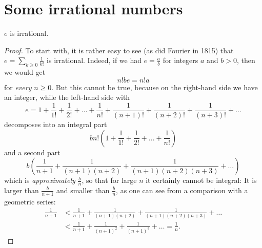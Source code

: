 \chapter{Some irrational numbers}


\begin{theorem}
  \label{e_irrational}
  \leanok
  $e$ is irrational.
\end{theorem}	
\begin{proof}
  To start with, it is rather easy to see (as did Fourier in 1815) that $e = \sum_{k \ge 0} \frac{1}{k!}$ is irrational.
  Indeed, if we had $e = \frac{a}{b}$ for integers $a$ and $b > 0$, then we would get
  \[
  n! b e = n! a
  \]
  for \emph{every} $n \ge 0$.
  But this cannot be true, because on the right-hand side we have an integer, while the left-hand side with
  \[
  e = 1 + \frac{1}{1!} + \frac{1}{2!} + \dots + \frac{1}{n!} + \frac{1}{(n+1)!} + \frac{1}{(n+2)!} + \frac{1}{(n+3)!} + \dots
  \]
  decomposes into an integral part
  \[
  b n! \left( 1 + \frac{1}{1!} + \frac{1}{2!} + \dots + \frac{1}{n!} \right)
  \]
  and a second part
  \[
  b \left( \frac{1}{n+1} + \frac{1}{(n+1)(n+2)} + \frac{1}{(n+1)(n+2)(n+3)} + \dots \right)
  \]
  which is \emph{approximately} $\frac{b}{n}$, so that for large $n$ it certainly cannot be integral:
  It is larger than $\frac{b}{n+1}$ and smaller than $\frac{b}{n}$, as one can see from a comparison with a geometric series:
  \begin{align*}
  \frac{1}{n+1} &< \frac{1}{n+1} + \frac{1}{(n+1)(n+2)} + \frac{1}{(n+1)(n+2)(n+3)} + \dots \\
  &< \frac{1}{n+1} + \frac{1}{(n+1)^2} + \frac{1}{(n+1)^3} + \dots = \frac{1}{n}.
  \end{align*}
\end{proof}

